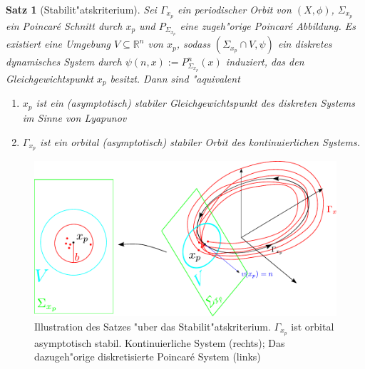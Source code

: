 \documentclass[a4paper, 13pt]{scrreprt}
\newtheorem{satz}{Satz}[section]
\theoremstyle{definition} \newtheorem{definition}{Definition}[section]
\newcommand{\RR}{\mathbb{R}}
\begin{document}
\begin{satz}[Stabilit"atskriterium]\label{stabilitatskriterium_periodische_orbits}
Sei $\Gamma_{x_p}$ ein periodischer Orbit von $(X, \phi)$, $\Sigma_{x_p}$ ein Poincar\'{e} Schnitt durch $x_p$ und $P_{\Sigma_{x_p}}$ eine zugeh"orige Poincar\'{e} Abbildung. Es existiert eine Umgebung $V\subseteq \RR^n$ von $x_p$, sodass $(\Sigma_{x_p}\cap V, \psi)$ ein diskretes dynamisches System durch $\psi(n, x) := P_{\Sigma_{x_p}}^n(x)$ induziert, das den Gleichgewichtspunkt $x_p$ besitzt. 
Dann sind "aquivalent
\begin{enumerate}
\item $x_p$ ist ein (asymptotisch) stabiler Gleichgewichtspunkt des diskreten Systems im Sinne von Lyapunov
\item $\Gamma_{x_p}$ ist ein orbital (asymptotisch) stabiler Orbit des kontinuierlichen Systems.
\end{enumerate}
\end{satz}
\begin{figure}[htpb]
		\centering
		\includegraphics[width=1\textwidth]{img/periodische_orbits/stabilitaetskriterium.pdf}
		\caption{Illustration des Satzes "uber das Stabilit"atskriterium. $\Gamma_{x_p}$ ist orbital asymptotisch stabil. Kontinuierliche System (rechts); Das dazugeh"orige diskretisierte Poincar\'{e} System (links)}
\end{figure}
\end{document}
